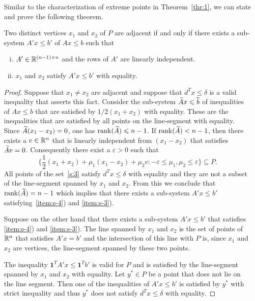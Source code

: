 Similar to the characterization of extreme points in Theorem~\ref{thr:1}, we can state and prove the following theorem. 

\begin{theorem}
  \label{thr:s-3}
  Two distinct vertices $x_1$ and $x_2$ of $P$ are adjacent if and
  only if there exists a sub-system $A'x \leq b'$ of $Ax \leq b$ such
  that
  \begin{enumerate}[i)]
  \item $A' \in \mathbb{R}^{(n-1)\times n}$ and the rows of $A'$ are linearly
    independent. \label{item:s-4}
  \item $x_1$ and $x_2$ satisfy $A'x \leq b'$ with
    equality. \label{item:s-3}
  \end{enumerate}
\end{theorem}

\begin{proof}
  Suppose that $x_1 \neq x_2$ are adjacent and suppose that $d^Tx \leq
  \delta$ is a valid inequality that asserts this fact. Consider the sub-system $\widetilde{A} x \leqslant \widetilde{b}$ of inequalities  of $Ax \leq b$ that are satisfied by $1/2 (x_1 + x_2)$ with equality. These are the inequalities that are satisfied by all points on the line-segment with equality. Since  $\widetilde{A}(x_1-x_2) = 0$, one has $\mathrm{rank}(\widetilde{A}) \leqslant n-1$. If $\mathrm{rank}(\widetilde{A}) < n-1$, then there exists a $v \in \mathbb{R}^n$ that is linearly independent from $(x_1-x_2)$ that satisfies $\widetilde{A} v = 0$. Consequently there exist a $\varepsilon >0$ such that 
  \begin{equation}
    \label{s:3}    
    \{ \frac{1}{2}(x_1+x_2) + \mu_1 (x_1-x_2) + \mu_2 v \colon -\varepsilon \leq \mu_1,\mu_2 \leq \varepsilon \} \subseteq P. 
  \end{equation}
All points of the set~\eqref{s:3} satisfy $d^Tx \leq \delta$ with equality and they are not a subset of the line-segment spanned by $x_1$ and $x_2$. From this we conclude that $\mathrm{rank}(\widetilde{A}) = n-1$ which implies that there exists a sub-system $A'x \leq b'$ satisfying~\ref{item:s-4}) and \ref{item:s-3}). 

Suppose on the other hand that there exists a sub-system $A'x \leq b'$
that satisfies \ref{item:s-4}) and \ref{item:s-3}).  The line spanned
by $x_1$ and $x_2$ is the set of points of $\mathbb{R}^n$ that satisfies $A'x
= b'$ and the intersection of this line with $P$ is, since $x_1$
and $x_2$ are vertices, the line-segment spanned by these two points.

The inequality $\mathbf{1}^T A'x \leq \mathbf{1}^T b'$ is valid for $P$ and is satisfied by the line-segment spanned by $x_1$ and $x_2$ with equality. Let $y^* \in P$ be a point  that does not lie on the line segment. Then one of the inequalities of $A'x \leq b'$ is satisfied by $y^*$ with strict inequality and thus $y^*$ does not satisfy $d^Tx \leq \delta$ with equality. 
\end{proof}




